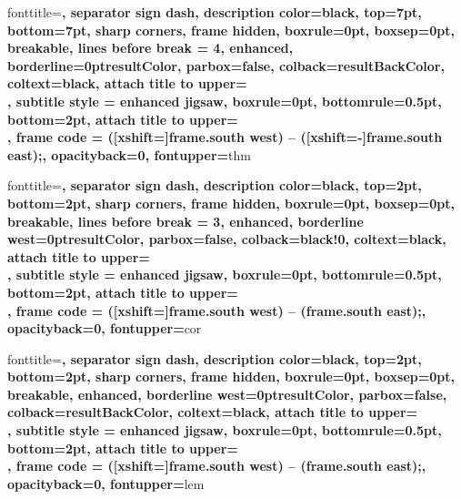 \renewcommand{\qedsymbol}{$\square$}%
\usepackage[most]{tcolorbox}
%
{fonttitle=\sffamily\bfseries\color{resultColor},
      separator sign dash, description color=black,
      top=7pt, bottom=7pt,
      sharp corners, frame hidden, boxrule=0pt, boxsep=0pt, breakable,
      lines before break = 4,
      enhanced, borderline={\the\tcbBorderWidth}{0pt}{resultColor},
      parbox=false,
      colback=resultBackColor,
      coltext=black,
      attach title to upper={\\},
      subtitle style = {enhanced jigsaw, boxrule=0pt, bottomrule=0.5pt, bottom=2pt,
      attach title to upper={\\},
      frame code = { ([xshift=\the\tcbBorderWidth]frame.south west) -- ([xshift=-\the\tcbBorderWidth]frame.south east);}, 
      opacityback=0, fontupper=\color{black}}}{thm}
    {\begin{tcbtheo}{#1}{#2}}{\end{tcbtheo}}
%
{fonttitle=\sffamily\bfseries\color{resultColor},
      separator sign dash, description color=black,
      top=2pt, bottom=2pt,
      sharp corners,
      frame hidden, boxrule=0pt, boxsep=0pt, breakable,
      lines before break = 3,
      enhanced, borderline west={\the\tcbBorderWidth}{0pt}{resultColor},
      parbox=false,
      colback=black!0,
      coltext=black,
      attach title to upper={\\},
      subtitle style = {enhanced jigsaw, boxrule=0pt, bottomrule=0.5pt, bottom=2pt,
      attach title to upper={\\},
      frame code = { ([xshift=\the\tcbBorderWidth]frame.south west) -- (frame.south east);}, 
      opacityback=0, fontupper=\color{black}}}{cor}
    {\begin{tcbcorollary}{#1}{#2}}{\end{tcbcorollary}}
     {fonttitle=\sffamily\bfseries\color{resultColor},
      separator sign dash, description color=black,
      top=2pt, bottom=2pt,
      sharp corners,
      frame hidden, boxrule=0pt, boxsep=0pt, breakable,
      enhanced, borderline west={\the\tcbBorderWidth}{0pt}{resultColor},
      parbox=false,
      colback=resultBackColor,
      coltext=black,
      attach title to upper={\\},
      subtitle style = {enhanced jigsaw, boxrule=0pt, bottomrule=0.5pt, bottom=2pt,
      attach title to upper={\\},
      frame code = { ([xshift=\the\tcbBorderWidth]frame.south west) -- (frame.south east);}, 
      opacityback=0, fontupper=\color{black}}}{lem}

